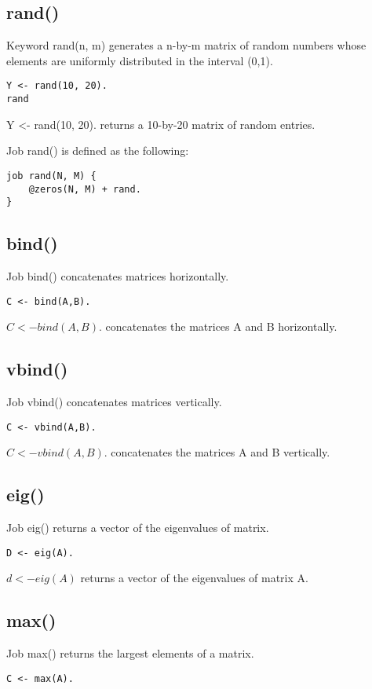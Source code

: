 \documentclass[prodmode,acmtecs]{acmsmall}
\begin{document}
\subsection{rand()}
Keyword rand(n, m) generates a n-by-m matrix of random numbers whose elements are
uniformly distributed in the interval (0,1).
\begin{lstlisting}
Y <- rand(10, 20).
rand
\end{lstlisting}

Y <- rand(10, 20). returns a 10-by-20 matrix of random entries.

Job rand() is defined as the following:
\begin{lstlisting}
job rand(N, M) {
    @zeros(N, M) + rand.
} 
\end{lstlisting}
\medskip

\subsection{bind()}
Job bind() concatenates matrices horizontally.
\begin{lstlisting}
C <- bind(A,B).
\end{lstlisting}

$C <- bind(A,B).$ concatenates the matrices A and B horizontally.
\medskip

\subsection{vbind()}
Job vbind() concatenates matrices vertically.
\begin{lstlisting}
C <- vbind(A,B).
\end{lstlisting}

$C <- vbind(A,B).$ concatenates the matrices A and B vertically.
\medskip

\subsection{eig()}
Job eig() returns a vector of the eigenvalues of matrix.
\begin{lstlisting}
D <- eig(A).
\end{lstlisting}

$d <- eig(A)$ returns a vector of the eigenvalues of matrix A.
\medskip

\subsection{max()}
Job max() returns the largest elements of a matrix.
\begin{lstlisting}
C <- max(A).
\end{lstlisting}
\end{document}
